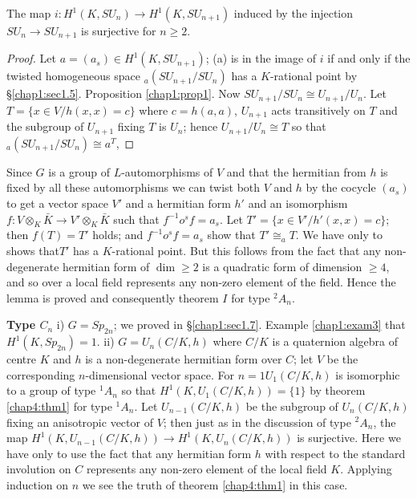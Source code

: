  \begin{lem}%
The map $i : H^1(K,SU_n) \to H^1(K,SU_{n+1})$ induced by the injection
$SU_n \to SU_{n+1}$ is surjective for $n \ge 2$. 
 \end{lem} 
 
 \begin{proof}
Let $a=(a_s) \in H^1(K,SU_{n+1})$; (a) is in the image of $i$ if and
only if the twisted homogeneous space ${}_a(SU_{n+1}/ SU_n)$ has a
$K$-rational point by \S \ref{chap1:sec1.5}. Proposition
\ref{chap1:prop1}. Now $SU_{n+1}/ SU_n 
\cong U_{n+1}/U_n$. Let $T= \bigg\{ x \in V/h(x,x)=c \bigg\} $ where
$c=h(a,a)$, $U_{n+1}$ acts transitively on $T$ and the subgroup of
$U_{n+1}$ fixing $T$ is $U_n$; hence $U_{n+1}/U_n \cong T$ so that
${}_a(SU_{n+1}/SU_n)\cong a^T$, 
\end{proof} 

Since $G$ is a group of $L$-automorphisms of $V$ and that the 
hermitian from $h$ is fixed by all these automorphisms we can twist
both $V$ and $h$ by the cocycle $(a_s)$ to get a vector space $V'$ and
a hermitian form $h'$ and an isomorphism $f: V \otimes_K \bar{K} \to
V' \otimes_K \bar{K}$ such that $f^{-1}o^s f=a_s$. Let $T'=\bigg\{ x
\in V'/h'(x,x)=c \bigg\}$; then $f(T)=T'$ holds; and $f^{-1}o^s
f=a_s$ show that $T' \cong_a T$. We have only to shows
that\pageoriginale $T'$ has 
a $K$-rational point. But this follows from the fact that any
non-degenerate hermitian form of $\dim \ge 2$ is a quadratic form of
dimension $\ge 4$, and so over a local field represents any non-zero
element of the field. Hence the lemma is proved and consequently
theorem $I$ for type ${}^2 A_n$. 

\noindent
{\bf Type $C_n$} i) $G=Sp_{2n}$; we proved in \S \ref{chap1:sec1.7}. Example
\ref{chap1:exam3} that $H^1(K,Sp_{2n})=1$. ii) $G=U_n(C/K,h)$ where $C/K$ is a
quaternion algebra of centre $K$ and $h$ is a non-degenerate hermitian
form over $C$; let $V$ be the corresponding $n$-dimensional vector
space. For $n=1 U_1(C/K,h)$ is isomorphic to a group of type ${}^1A_n$
so that $H^1(K,U_1(C/K,h))=\{1\}$ by theorem 
\ref{chap4:thm1} for type ${}^1A_n$. Let $U_{n-1}(C/K,h)$ be the subgroup of
$U_n(C/K,h)$ fixing an anisotropic vector of $V$; then just as in the
discussion of type ${}^2A_n$, the map $H^1(K,U_{n-1}(C/K,h)) \to H^1
(K,U_n(C/K,h))$ is surjective. Here we have only to use the fact that
any hermitian form $h$ with respect to the standard involution on $C$
represents any non-zero element of the local field $K$. Applying
induction on $n$ we see the truth of theorem \ref{chap4:thm1} in this case. 
  
